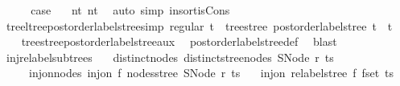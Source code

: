 \begin{isabellebody}
\ \ \isamarkupfalse%
\ \isamarkupfalse%
\ {\isacharquery}{\kern0pt}case\ \isamarkupfalse%
\ {}\ nt{\isacharprime}{\kern0pt}\ nt{\isacharprime}{\kern0pt}{\isacharprime}{\kern0pt}\ \isamarkupfalse%
\ {\isacharparenleft}{\kern0pt}auto\ simp{\isacharcolon}{\kern0pt}\ insort{\isacharunderscore}{\kern0pt}is{\isacharunderscore}{\kern0pt}Cons{\isacharparenright}{\kern0pt}\isanewline
{}\isamarkupfalse%
%
\endisatagproof
{\isafoldproof}%
%
\isadelimproof
\isanewline
%
\endisadelimproof
\isanewline
{}\isamarkupfalse%
\ tree{\isacharunderscore}{\kern0pt}ltree{\isacharunderscore}{\kern0pt}postorder{\isacharunderscore}{\kern0pt}label{\isacharunderscore}{\kern0pt}stree{\isacharbrackleft}{\kern0pt}simp{\isacharbrackright}{\kern0pt}{\isacharcolon}{\kern0pt}\ {\isachardoublequoteopen}regular\ t\ {\isasymLongrightarrow}\ tree{\isacharunderscore}{\kern0pt}stree\ {\isacharparenleft}{\kern0pt}postorder{\isacharunderscore}{\kern0pt}label{\isacharunderscore}{\kern0pt}stree\ t{\isacharparenright}{\kern0pt}\ {\isacharequal}{\kern0pt}\ t{\isachardoublequoteclose}\isanewline
%
\isadelimproof
\ \ %
\endisadelimproof
%
\isatagproof
{}\isamarkupfalse%
\ tree{\isacharunderscore}{\kern0pt}stree{\isacharunderscore}{\kern0pt}postorder{\isacharunderscore}{\kern0pt}label{\isacharunderscore}{\kern0pt}stree{\isacharunderscore}{\kern0pt}aux\ \isamarkupfalse%
\ postorder{\isacharunderscore}{\kern0pt}label{\isacharunderscore}{\kern0pt}stree{\isacharunderscore}{\kern0pt}def\ \isamarkupfalse%
\ blast%
\endisatagproof
{\isafoldproof}%
%
\isadelimproof
\isanewline
%
\endisadelimproof
\isanewline
{}\isamarkupfalse%
\ inj{\isacharunderscore}{\kern0pt}relabel{\isacharunderscore}{\kern0pt}subtrees{\isacharcolon}{\kern0pt}\isanewline
\ \ \ distinct{\isacharunderscore}{\kern0pt}nodes{\isacharcolon}{\kern0pt}\ {\isachardoublequoteopen}distinct{\isacharunderscore}{\kern0pt}stree{\isacharunderscore}{\kern0pt}nodes\ {\isacharparenleft}{\kern0pt}SNode\ r\ ts{\isacharparenright}{\kern0pt}{\isachardoublequoteclose}\isanewline
\ \ \ \ \ inj{\isacharunderscore}{\kern0pt}on{\isacharunderscore}{\kern0pt}nodes{\isacharcolon}{\kern0pt}\ {\isachardoublequoteopen}inj{\isacharunderscore}{\kern0pt}on\ f\ {\isacharparenleft}{\kern0pt}nodes{\isacharunderscore}{\kern0pt}stree\ {\isacharparenleft}{\kern0pt}SNode\ r\ ts{\isacharparenright}{\kern0pt}{\isacharparenright}{\kern0pt}{\isachardoublequoteclose}\isanewline
\ \ \ {\isachardoublequoteopen}inj{\isacharunderscore}{\kern0pt}on\ {\isacharparenleft}{\kern0pt}relabel{\isacharunderscore}{\kern0pt}stree\ f{\isacharparenright}{\kern0pt}\ {\isacharparenleft}{\kern0pt}fset\ ts{\isacharparenright}{\kern0pt}{\isachardoublequoteclose}\isanewline

\end{isabellebody}
